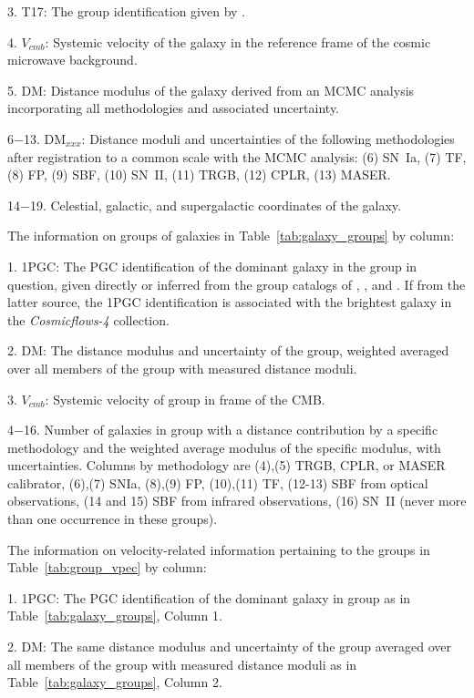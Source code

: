\documentclass[twocolumn]{aastex63}
\begin{document}
3. T17: The group identification given by \citet{2017A&A...602A.100T}.

4. $V_{cmb}$: Systemic velocity of the galaxy in the reference frame of the cosmic microwave background.

5. DM: Distance modulus of the galaxy derived from an MCMC analysis incorporating all methodologies and associated uncertainty.

6$-$13. DM$_{xxx}$: Distance moduli and uncertainties of the following methodologies after registration to a common scale with the MCMC analysis: (6) SN~Ia, (7) TF, (8) FP, (9) SBF, (10) SN~II, (11) TRGB, (12) CPLR, (13) MASER.

14$-$19. Celestial, galactic, and supergalactic coordinates of the galaxy.

\bigskip
The information on groups of galaxies in Table~\ref{tab:galaxy_groups} by column:

1. 1PGC: The PGC identification of the dominant galaxy in the group in question, given directly or inferred from the group catalogs of \citet{2017ApJ...843...16K}, \citet{2015AJ....149..171T}, and \citet{2017A&A...602A.100T}.  If from the latter source, the 1PGC identification is associated with the brightest galaxy in the {\it Cosmicflows-4} collection.

2. DM: The distance modulus and uncertainty of the group, weighted averaged over all members of the group with measured distance moduli.

3. $V_{cmb}$: Systemic velocity of group in frame of the CMB.

4$-$16. Number of galaxies in group with a distance contribution by a specific methodology and the weighted average modulus of the specific modulus, with uncertainties.  Columns by methodology are (4),(5) TRGB, CPLR, or MASER calibrator, (6),(7) SNIa, (8),(9) FP, (10),(11) TF, (12-13) SBF from optical observations, (14 and 15) SBF from infrared observations, (16) SN~II (never more than one occurrence in these groups). 

\bigskip
The information on velocity-related information pertaining to the groups in Table~\ref{tab:group_vpec} by column:

1. 1PGC: The PGC identification of the dominant galaxy in group as in Table~\ref{tab:galaxy_groups}, Column 1.

2. DM: The same distance modulus and uncertainty of the group averaged over all members of the group with measured distance moduli as in Table~\ref{tab:galaxy_groups}, Column 2.
\end{document}
